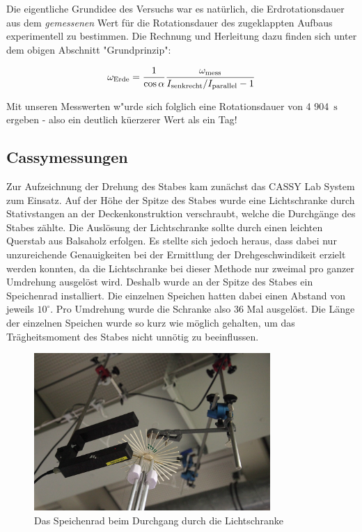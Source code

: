\documentclass[11pt]{scrartcl}
\newcommand{\unit}[1]{\ensuremath{\,\mathrm{#1}}} %
\newcommand{\ltext}[1]{\ensuremath{_{\textnormal{#1}}}}
\begin{document}
Die eigentliche Grundidee des Versuchs war es nat\"urlich, die Erdrotationsdauer aus dem \textit{gemessenen} Wert f\"ur die Rotationsdauer des zugeklappten Aufbaus experimentell zu bestimmen. Die Rechnung und Herleitung dazu finden sich unter dem obigen Abschnitt "Grundprinzip":

\[\omega\ltext{Erde} = 
\frac{1}{\cos\alpha}
\frac{\omega\ltext{mess}}{I\ltext{senkrecht} / I\ltext{parallel} - 1}\]

Mit unseren Messwerten w"urde sich folglich eine Rotationsdauer von 4 904 \unit{s} ergeben - also ein deutlich k\"uerzerer Wert als ein Tag!

\subsection{Cassymessungen} %
Zur Aufzeichnung der Drehung des Stabes kam zun\"achst das CASSY Lab System zum Einsatz. Auf der H\"ohe der Spitze des Stabes wurde eine Lichtschranke durch Stativstangen an der Deckenkonstruktion verschraubt, welche die Durchg\"ange des Stabes z\"ahlte. Die Ausl\"osung der Lichtschranke sollte durch einen leichten Querstab aus Balsaholz erfolgen. Es stellte sich jedoch heraus, dass dabei nur unzureichende Genauigkeiten bei der Ermittlung der Drehgeschwindikeit erzielt werden konnten, da die Lichtschranke bei dieser Methode nur zweimal pro ganzer Umdrehung ausgel\"ost wird. Deshalb wurde an der Spitze des Stabes ein \glqq Speichenrad\grqq{} installiert. Die einzelnen Speichen hatten dabei einen Abstand von jeweils $10^\circ$. Pro Umdrehung wurde die Schranke also 36 Mal ausgel\"ost. Die L\"ange der einzelnen Speichen wurde so kurz wie m\"oglich gehalten, um das Tr\"agheitsmoment des Stabes nicht unn\"otig zu beeinflussen.
\begin{figure}[ht]
\begin{center}
\includegraphics[width=0.8\textwidth]{lichtschranke.jpg}
\end{center}
\vspace{-1.5\baselineskip}
\caption{Das Speichenrad beim Durchgang durch die Lichtschranke}
\label{lichtschranke}
\end{figure}
\end{document}
